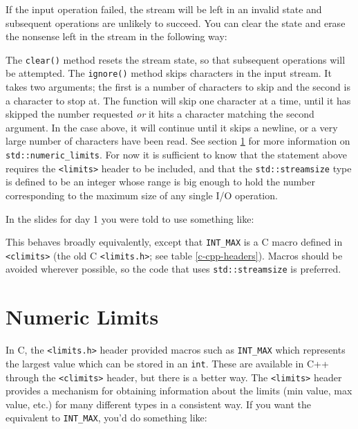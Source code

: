 \documentclass[a4paper]{scrartcl}
\begin{document}
If the input operation failed, the stream will be left in an invalid state and subsequent operations are unlikely to succeed. You can clear the state and erase the nonsense left in the stream in the following way:



The \texttt{clear()} method resets the stream state, so that subsequent operations will be attempted. The \texttt{ignore()} method skips characters in the input stream. It takes two arguments; the first is a number of characters to skip and the second is a character to stop at. The function will skip one character at a time, until it has skipped the number requested \emph{or} it hits a character matching the second argument. In the case above, it will continue until it skips a newline, or a very large number of characters have been read. See section \ref{numeric-limits} for more information on \texttt{std::numeric\_limits}. For now it is sufficient to know that the statement above requires the \texttt{<limits>} header to be included, and that the \texttt{std::streamsize} type is defined to be an integer whose range is big enough to hold the number corresponding to the maximum size of any single I/O operation.

In the slides for day 1 you were told to use something like:



This behaves broadly equivalently, except that \texttt{INT\_MAX} is a C macro defined in \texttt{<climits>} (the old C \texttt{<limits.h>}; see table \ref{c-cpp-headers}). Macros should be avoided wherever possible, so the code that uses \texttt{std::streamsize} is preferred.

\section{Numeric Limits}\label{numeric-limits}
In C, the \texttt{<limits.h>} header provided macros such as \texttt{INT\_MAX} which represents the largest value which can be stored in an \texttt{int}. These are available in C++ through the \texttt{<climits>} header, but there is a better way. The \texttt{<limits>} header provides a mechanism for obtaining information about the limits (min value, max value, etc.) for many different types in a consistent way. If you want the equivalent to \texttt{INT\_MAX}, you'd do something like:


\end{document}
